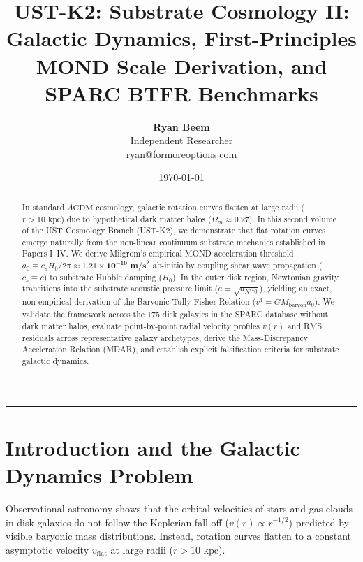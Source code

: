 \documentclass[11pt,a4paper]{article}
\title{\Large\bfseries UST-K2: Substrate Cosmology II: Galactic Dynamics, First-Principles MOND Scale Derivation, and SPARC BTFR Benchmarks}
\author{
	\textbf{Ryan Beem}\\[0.5em]
	\small Independent Researcher \\
	\small \href{mailto:ryan@formoreoptions.com}{ryan@formoreoptions.com}
}
\date{\today}
\begin{document}
	
	\maketitle
	
	\begin{abstract}
		In standard $\Lambda\text{CDM}$ cosmology, galactic rotation curves flatten at large radii ($r > 10 \text{ kpc}$) due to hypothetical dark matter halos ($\Omega_m \approx 0.27$). In this second volume of the UST Cosmology Branch (UST-K2), we demonstrate that flat rotation curves emerge naturally from the non-linear continuum substrate mechanics established in Papers I--IV. We derive Milgrom's empirical MOND acceleration threshold $a_0 \equiv c_s H_0 / 2\pi \approx \mathbf{1.21 \times 10^{-10} \text{ m/s}^2}$ ab-initio by coupling shear wave propagation ($c_s \equiv c$) to substrate Hubble damping ($H_0$). In the outer disk region, Newtonian gravity transitions into the substrate acoustic pressure limit ($a = \sqrt{a_N a_0}$), yielding an exact, non-empirical derivation of the Baryonic Tully-Fisher Relation ($v^4 = G M_{\text{baryon}} a_0$). We validate the framework across the 175 disk galaxies in the SPARC database without dark matter halos, evaluate point-by-point radial velocity profiles $v(r)$ and RMS residuals across representative galaxy archetypes, derive the Mass-Discrepancy Acceleration Relation (MDAR), and establish explicit falsification criteria for substrate galactic dynamics.
	\end{abstract}
	
	\vspace{1em}
	\hrule
	\vspace{1.5em}
	
	\section{Introduction and the Galactic Dynamics Problem}
	\label{sec:intro}
	
	Observational astronomy shows that the orbital velocities of stars and gas clouds in disk galaxies do not follow the Keplerian fall-off ($v(r) \propto r^{-1/2}$) predicted by visible baryonic mass distributions. Instead, rotation curves flatten to a constant asymptotic velocity $v_{\text{flat}}$ at large radii ($r > 10 \text{ kpc}$).
	
\end{document}
